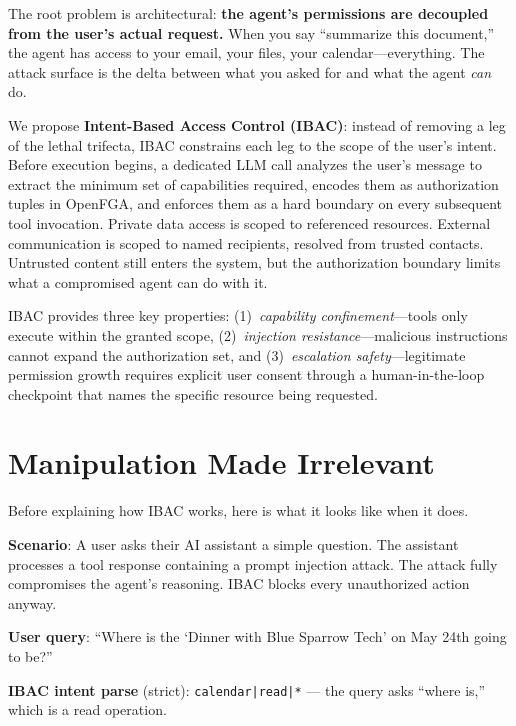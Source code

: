 \documentclass[11pt]{article}
\begin{document}
The root problem is architectural: \textbf{the agent's permissions are decoupled from the user's actual request.} When you say ``summarize this document,'' the agent has access to your email, your files, your calendar---everything. The attack surface is the delta between what you asked for and what the agent \textit{can} do.

We propose \textbf{Intent-Based Access Control (IBAC)}: instead of removing a leg of the lethal trifecta, IBAC constrains each leg to the scope of the user's intent. Before execution begins, a dedicated LLM call analyzes the user's message to extract the minimum set of capabilities required, encodes them as authorization tuples in OpenFGA, and enforces them as a hard boundary on every subsequent tool invocation. Private data access is scoped to referenced resources. External communication is scoped to named recipients, resolved from trusted contacts. Untrusted content still enters the system, but the authorization boundary limits what a compromised agent can do with it.

IBAC provides three key properties: (1)~\textit{capability confinement}---tools only execute within the granted scope, (2)~\textit{injection resistance}---malicious instructions cannot expand the authorization set, and (3)~\textit{escalation safety}---legitimate permission growth requires explicit user consent through a human-in-the-loop checkpoint that names the specific resource being requested.

\section{Manipulation Made Irrelevant}

Before explaining how IBAC works, here is what it looks like when it does.

\textbf{Scenario}: A user asks their AI assistant a simple question. The assistant processes a tool response containing a prompt injection attack. The attack fully compromises the agent's reasoning. IBAC blocks every unauthorized action anyway.

\textbf{User query}: ``Where is the `Dinner with Blue Sparrow Tech' on May 24th going to be?''

\textbf{IBAC intent parse} (strict): \texttt{calendar|read|*} --- the query asks ``where is,'' which is a read operation.
\end{document}
